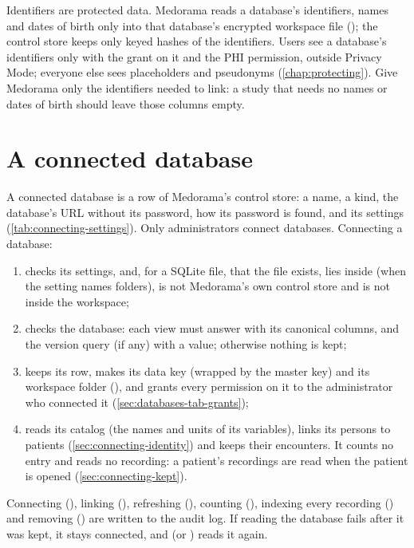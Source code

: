 \begin{phibox}
Identifiers are protected data. Medorama reads a database's identifiers, names and dates of
birth only into that database's encrypted workspace file (); the control
store keeps only keyed hashes of the identifiers. Users see a database's identifiers only with
the  grant on it and the PHI permission, outside Privacy Mode; everyone else sees
placeholders and pseudonyms (\cref{chap:protecting}). Give Medorama only the identifiers needed
to link: a study that needs no names or dates of birth should leave those columns empty.
\end{phibox}

\section{A connected database}
\label{sec:connecting-connection}

A connected database is a row of Medorama's control store: a name, a kind, the database's URL
without its password, how its password is found, and its settings
(\cref{tab:connecting-settings}). Only administrators connect databases. Connecting a database:
\begin{enumerate}
\item checks its settings, and, for a SQLite file, that the file exists, lies inside
   (when the setting names folders), is not Medorama's own control store and is
  not inside the workspace;
\item checks the database: each view must answer with its canonical columns, and the version
  query (if any) with a value; otherwise nothing is kept;
\item keeps its row, makes its data key (wrapped by the master key) and its workspace folder
  (), and grants every permission on it to the administrator who
  connected it (\cref{sec:databases-tab-grants});
\item reads its catalog (the names and units of its variables), links its persons to patients
  (\cref{sec:connecting-identity}) and keeps their encounters. It counts no entry and reads no
  recording: a patient's recordings are read when the patient is opened
  (\cref{sec:connecting-kept}).
\end{enumerate}
Connecting (), linking (), refreshing (), counting
(), indexing every recording () and removing () are
written to the audit log. If reading the database fails after it was kept,
it stays connected, and  (or ) reads it again.

